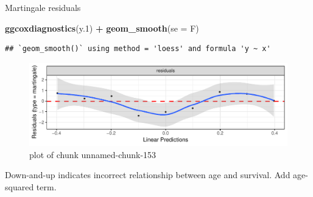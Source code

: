 \documentclass[ignorenonframetext,]{beamer}
\newenvironment{Shaded}{\begin{snugshade}}{\end{snugshade}}
\newcommand{\DataTypeTok}[1]{\textcolor[rgb]{0.13,0.29,0.53}{#1}}
\newcommand{\FloatTok}[1]{\textcolor[rgb]{0.00,0.00,0.81}{#1}}
\newcommand{\KeywordTok}[1]{\textcolor[rgb]{0.13,0.29,0.53}{\textbf{#1}}}
\newcommand{\NormalTok}[1]{#1}
\newcommand{\OperatorTok}[1]{\textcolor[rgb]{0.81,0.36,0.00}{\textbf{#1}}}
\newcommand{\StringTok}[1]{\textcolor[rgb]{0.31,0.60,0.02}{#1}}
\begin{document}
\begin{frame}[fragile]{Martingale residuals}
\protect\hypertarget{martingale-residuals}{}

\begin{Shaded}
\begin{Highlighting}[]
\KeywordTok{ggcoxdiagnostics}\NormalTok{(y}\FloatTok{.1}\NormalTok{) }\OperatorTok{+}\StringTok{ }\KeywordTok{geom_smooth}\NormalTok{(}\DataTypeTok{se =}\NormalTok{ F)}
\end{Highlighting}
\end{Shaded}

\begin{verbatim}
## `geom_smooth()` using method = 'loess' and formula 'y ~ x'
\end{verbatim}

\begin{figure}
\centering
\includegraphics{figure/unnamed-chunk-153-1.pdf}
\caption{plot of chunk unnamed-chunk-153}
\end{figure}

Down-and-up indicates incorrect relationship between age and survival.
Add age-squared term.

\end{frame}
\end{document}

